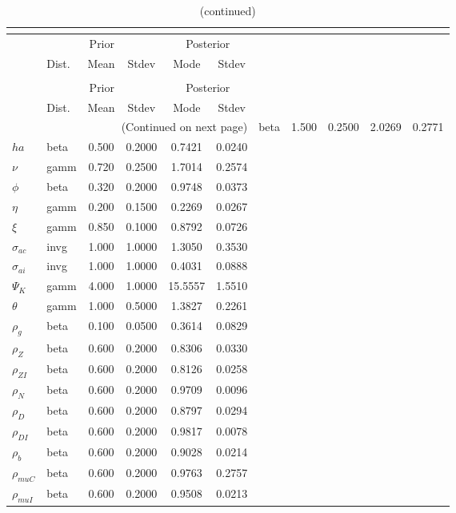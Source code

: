  
\begin{center}
\begin{longtable}{llcccc} 
\caption{Results from posterior maximization (parameters)}\\
 \label{Table:Posterior:1}\\
\toprule 
  & \multicolumn{3}{c}{Prior}  &  \multicolumn{2}{c}{Posterior} \\
  \cmidrule(r{.75em}){2-4} \cmidrule(r{.75em}){5-6}
  & Dist. & Mean  & Stdev & Mode & Stdev \\ 
\midrule \endfirsthead 
\caption{(continued)}\\
 \bottomrule 
  & \multicolumn{3}{c}{Prior}  &  \multicolumn{2}{c}{Posterior} \\
  \cmidrule(r{.75em}){2-4} \cmidrule(r{.75em}){5-6}
  & Dist. & Mean  & Stdev & Mode & Stdev \\ 
\midrule \endhead 
\bottomrule \multicolumn{6}{r}{(Continued on next page)}\endfoot 
\bottomrule\endlastfoot 
${\sigma}$ & beta &   1.500 & 0.2500 &   2.0269 &  0.2771 \\ 
${ha}$ & beta &   0.500 & 0.2000 &   0.7421 &  0.0240 \\ 
$\nu$ & gamm &   0.720 & 0.2500 &   1.7014 &  0.2574 \\ 
${\phi}$ & beta &   0.320 & 0.2000 &   0.9748 &  0.0373 \\ 
${\eta}$ & gamm &   0.200 & 0.1500 &   0.2269 &  0.0267 \\ 
$\xi$ & gamm &   0.850 & 0.1000 &   0.8792 &  0.0726 \\ 
${\sigma_{ac}}$ & invg &   1.000 & 1.0000 &   1.3050 &  0.3530 \\ 
${\sigma_{ai}}$ & invg &   1.000 & 1.0000 &   0.4031 &  0.0888 \\ 
${\Psi_{K}}$ & gamm &   4.000 & 1.0000 &  15.5557 &  1.5510 \\ 
${\theta}$ & gamm &   1.000 & 0.5000 &   1.3827 &  0.2261 \\ 
${\rho_g}$ & beta &   0.100 & 0.0500 &   0.3614 &  0.0829 \\ 
${\rho_Z}$ & beta &   0.600 & 0.2000 &   0.8306 &  0.0330 \\ 
${\rho_{ZI}}$ & beta &   0.600 & 0.2000 &   0.8126 &  0.0258 \\ 
${\rho_N}$ & beta &   0.600 & 0.2000 &   0.9709 &  0.0096 \\ 
${\rho_D}$ & beta &   0.600 & 0.2000 &   0.8797 &  0.0294 \\ 
${\rho_{DI}}$ & beta &   0.600 & 0.2000 &   0.9817 &  0.0078 \\ 
${\rho_b}$ & beta &   0.600 & 0.2000 &   0.9028 &  0.0214 \\ 
${\rho_{muC}}$ & beta &   0.600 & 0.2000 &   0.9763 &  0.2757 \\ 
${\rho_{muI}}$ & beta &   0.600 & 0.2000 &   0.9508 &  0.0213 \\ 
\end{longtable}
 \end{center}
